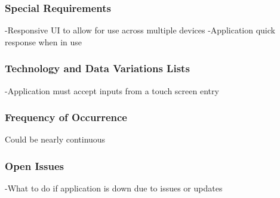 \documentclass{article}
\begin{document}
	\subsubsection{\textbf{Special Requirements}}
	-Responsive UI to allow for use across multiple devices
	-Application quick response when in use
	\subsubsection{\textbf{Technology and Data Variations Lists}}
	-Application must accept inputs from a touch screen entry
	\subsubsection{\textbf{Frequency of Occurrence}}
	Could be nearly continuous
	\subsubsection{\textbf{Open Issues}}
	-What to do if application is down due to issues or updates
	
\end{document}
